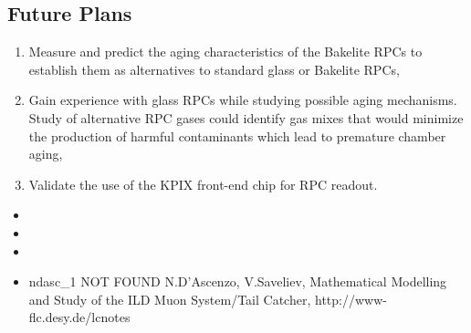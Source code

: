 \subsection{Future Plans}
\begin{enumerate}
\item Measure and predict the aging characteristics of the Bakelite RPCs to establish them as alternatives to standard glass or Bakelite RPCs,
\item Gain experience with glass RPCs while studying possible aging mechanisms. Study of alternative RPC gases could identify gas mixes that would minimize the production of harmful contaminants which lead to premature chamber aging,
\item Validate the use of the KPIX front-end chip for RPC readout.
\end{enumerate}


\begin{itemize}
	\item {}
	\item {}
	\item {}
	\item ndasc\_1 {\color{red} NOT FOUND} N.D'Ascenzo, V.Saveliev, Mathematical Modelling and Study of the ILD Muon System/Tail Catcher, http://www-flc.desy.de/lcnotes
\end{itemize}
